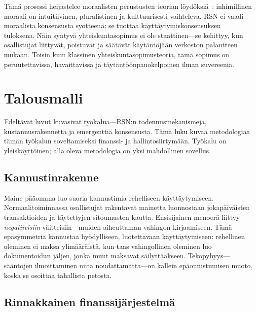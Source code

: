\documentclass[11pt,a4paper,twocolumn]{article}
\begin{document}
Tämä prosessi heijastelee moraalisten perustusten teorian löydöksiä~\cite{haidt2012}: inhimillinen moraali on intuitiivinen, pluralistinen ja kulttuurisesti vaihteleva. RSN ei vaadi moraalista konsensusta syötteenä; se tuottaa käyttäytymiskonsensuksen tuloksena. Näin syntyvä yhteiskuntasopimus ei ole staattinen---se kehittyy, kun osallistujat liittyvät, poistuvat ja säätävät käytäntöjään verkoston palautteen mukaan. Toisin kuin klassinen yhteiskuntasopimusteoria, tämä sopimus on peruutettavissa, havaittavissa ja täytäntöönpanokelpoinen ilman suvereenia.

\section{Talousmalli}

Edeltävät luvut kuvasivat työkalua---RSN:n todennusmekanismeja, kustannusrakennetta ja emergenttiä konsensusta. Tämä luku kuvaa metodologiaa tämän työkalun soveltamiseksi finanssi- ja hallintosiirtymään. Työkalu on yleiskäyttöinen; alla oleva metodologia on yksi mahdollinen sovellus.

\subsection{Kannustinrakenne}

Maine pääomana luo suoria kannustimia rehelliseen käyttäytymiseen. Normaalitoiminnassa osallistujat rakentavat mainetta luonnostaan jokapäiväisten transaktioiden ja täytettyjen sitoumusten kautta. Ensisijainen menoerä liittyy \emph{negatiivisiin} väitteisiin---muiden aiheuttaman vahingon kirjaamiseen. Tämä epäsymmetria kannustaa hyödylliseen, luotettavaan käyttäytymiseen: rehellinen oleminen ei maksa ylimääräistä, kun taas vahingollinen oleminen luo dokumentoidun jäljen, jonka muut maksavat säilyttääkseen. Tekopyhyys---sääntöjen ilmoittaminen niitä noudattamatta---on kallein epäonnistumisen muoto, koska se osoittaa tahallista petosta.

\subsection{Rinnakkainen finanssijärjestelmä}
\end{document}
